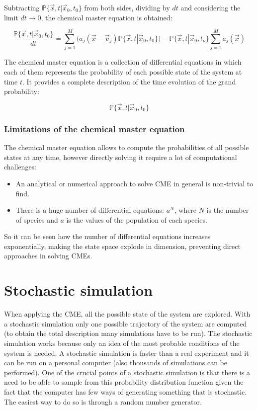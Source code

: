       Subtracting $\mathbb{P}\{\vec{x}, t|\vec{x}_0, t_0\}$ from both sides, dividing by $dt$ and considering the limit $dt\rightarrow 0$, the chemical master equation is obtained:

    $$\frac{\mathbb{P}\{\vec{x},t|\vec{x}_0,t_0\}}{dt}= \sum_{j=1}^{M}(a_j(\vec{x}-\vec{v}_j)\mathbb{P}\{\vec{x},t|\vec{x}_0,t_0\})- \mathbb{P}\{\vec{x},t|\vec{x}_0,t_o\}\sum^M_{j=1}a_j(\vec{x})$$

    The chemical master equation is a collection of differential equations in which each of them represents the probability of each possible state of the system at time $t$.
    It provides a complete description of the time evolution of the grand probability:

    $$\mathbb{P}\{\vec{x}, t|\vec{x}_0, t_0\}$$


    \subsubsection{Limitations of the chemical master equation}
    The chemical master equation allows to compute the probabilities of all possible states at any time, however directly solving it require a lot of computational challenges:

    \begin{multicols}{2}
      \begin{itemize}
        \item An analytical or numerical approach to solve CME in general is non-trivial to find.
        \item There is a huge number of differential equations: $a^N$, where $N$ is the number of species and $a$ is the values of the population of each species.
      \end{itemize}
    \end{multicols}

    So it can be seen how the number of differential equations increases exponentially, making the state space explode in dimension, preventing direct approaches in solving CMEs.

\section{Stochastic simulation}
When applying the CME, all the possible state of the system are explored.
With a stochastic simulation only one possible trajectory of the system are computed (to obtain the total description many simulations have to be run).
The stochastic simulation works because only an idea of the most probable conditions of the system is needed.
A stochastic simulation is faster than a real experiment and it can be run on a personal computer (also thousands of simulations can be performed).
One of the crucial points of a stochastic simulation is that there is a need to be able to sample from this probability distribution  function given the fact that the computer has few ways of generating something that is stochastic.
The easiest way to do so is through a random number generator.


